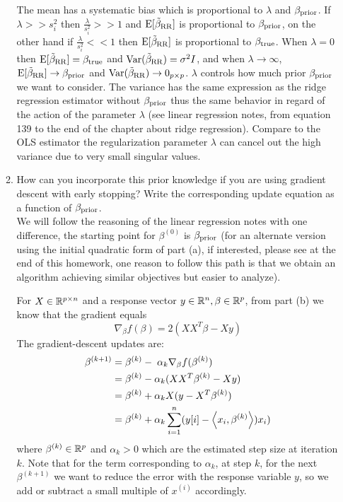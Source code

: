 \documentclass[12pt,twoside]{article}
\begin{document}
\begin{enumerate}
\begin{enumerate}
   The mean has a systematic bias which is proportional to $\lambda$ and  $\beta_{\operatorname{prior}}$. 
   If $\lambda >> s_i^2$ then $\frac{\lambda}{s_i^2} >> 1$ and $\mathrm{E}[\tilde{\beta}_{\operatorname{RR}} ]	$ is proportional to $\beta_{\operatorname{prior}} $, 
   on the other hand if $\frac{\lambda}{s_i^2} << 1$ then $\mathrm{E}[\tilde{\beta}_{\operatorname{RR}} ]	$ is proportional to $\beta_{\operatorname{true}}$.
   When $\lambda = 0$ then $\mathrm{E}[\tilde{\beta}_{\operatorname{RR}} ] = \beta_{\operatorname{true}}$ and $\mathrm{Var}(\tilde{\beta}_{\operatorname{RR}}) = \sigma^2 I$,
   and when $\lambda \rightarrow \infty$, $\mathrm{E}[\tilde{\beta}_{\operatorname{RR}} ] \rightarrow  \beta_{\operatorname{prior}}$ and $\mathrm{Var}(\tilde{\beta}_{\operatorname{RR}}) \rightarrow 0_{p \times p}$.
   $\lambda$ controls how much prior $\beta_{\operatorname{prior}}$ we want to consider.
   The variance has the same expression as the ridge regression estimator without $\beta_{\operatorname{prior}}$ thus the same behavior in regard of the action of the parameter $\lambda$ 
   (see linear regression notes, from equation 139 to the end of the chapter about ridge regression).
   Compare to the OLS estimator the regularization parameter $\lambda$ can cancel out the high variance due to very small singular values.
   
    \item How can you incorporate this prior knowledge if you are using gradient descent with early stopping? Write the corresponding update equation as a function of $\beta_{\operatorname{prior}}$.\\

\medskip				
We will follow the reasoning of the linear regression notes with one difference, the starting point for $\beta^{(0)}$ is $\beta_{\operatorname{prior}}$
(for an alternate version using the initial quadratic form of part (a), if interested, please see at the end of this homework, one reason to follow this path is that we obtain an algorithm achieving similar
objectives but easier to analyze).


For $X  \in \mathbb{R}^{p \times n}$ and a response vector $y \in \mathbb{R}^n, \beta \in \mathbb{R}^p$, from part (b) we know that the gradient equals $$\nabla_{\beta} f(\beta) =	2 (X X^T \beta - X y )$$
The gradient-descent updates are:
\begin{align*}
		\beta^{(k+1)}	&=	\beta^{(k)} - \; \alpha_k \nabla_{\beta} f(\beta^{(k)})	\\
					&=	\beta^{(k)}  - \alpha_k (X X^T \beta^{(k)} - X y) \\
					&=    \beta^{(k)}  +  \alpha_k  X (y   - X^T  \beta^{(k)})\\
					&=	 \beta^{(k)}  +  \alpha_k  \sum_{i=1}^n (y[i] - \left \langle x_i, \beta^{(k)}\right \rangle) x_i)
\end{align*}
   where $\beta^{(k)} \in \mathbb{R}^p$ and $ \alpha_k > 0$ which are the estimated step size at iteration $k$. Note that for the term corresponding to $\alpha_k$, at  step $k$, for the next $\beta^{(k+1)}$ 
   we want to reduce the error with the response variable $y$, so we add or subtract a small multiple of $x^{(i)}$ accordingly. 
   

\end{enumerate}
\end{enumerate}
\end{document}
